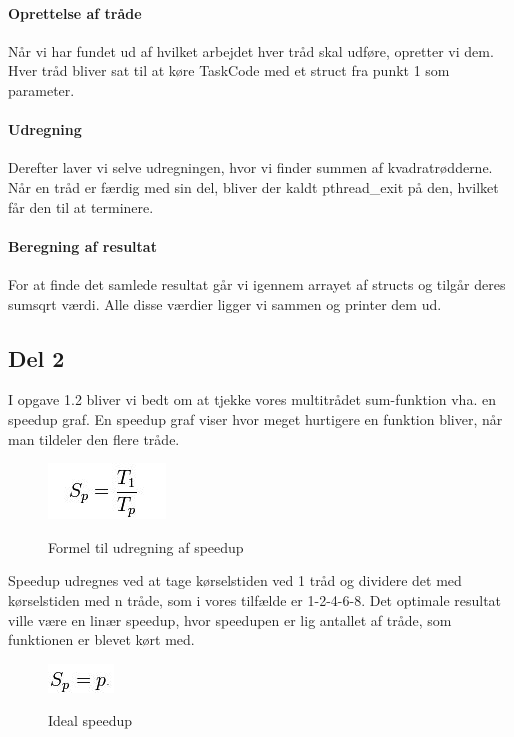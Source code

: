\paragraph{Oprettelse af tråde} Når vi har fundet ud af hvilket arbejdet hver tråd skal udføre, opretter vi dem. Hver tråd bliver sat til at køre TaskCode med et struct fra punkt 1 som parameter.
\paragraph{Udregning} Derefter laver vi selve udregningen, hvor vi finder summen af kvadratrødderne. Når en tråd er færdig med sin del, bliver der kaldt pthread\_exit på den, hvilket får den til at terminere.
\paragraph{Beregning af resultat} For at finde det samlede resultat går vi igennem arrayet af structs og tilgår deres sumsqrt værdi. Alle disse værdier ligger vi sammen og printer dem ud.

\subsection{Del 2}
\label{O1_2}
I opgave 1.2 bliver vi bedt om at tjekke vores multitrådet sum-funktion vha. en speedup graf.
En speedup graf viser hvor meget hurtigere en funktion bliver, når man tildeler den flere tråde. 

\begin{figure}[h!]
\centering
\caption{Formel til udregning af speedup}
\includegraphics{Images/oo2-1.2-SpeedUpFormel}
\label{SpeedFormel}
\end{figure}

Speedup udregnes ved at tage kørselstiden ved 1 tråd og dividere det med kørselstiden med n tråde, som i vores tilfælde er 1-2-4-6-8. Det optimale resultat ville være en linær speedup, hvor speedupen er lig antallet af tråde, som funktionen er blevet kørt med.


\begin{figure}[h!]
\centering
\caption{Ideal speedup}
\includegraphics{Images/oo2-1.2-IdealSpeedUp}
\label{IdealSpeed}
\end{figure}

